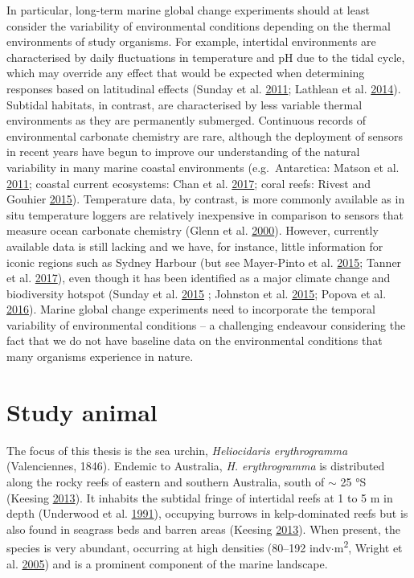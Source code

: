 \documentclass[a4paper,10pt, oneside]{memoir}
\begin{document}
In particular, long-term marine global change experiments should at least consider the variability of environmental conditions depending on the thermal environments of study organisms.
For example, intertidal environments are characterised by daily fluctuations in temperature and pH due to the tidal cycle, which may override any effect that would be expected when determining responses based on latitudinal effects (Sunday et al. \protect\hyperlink{ref-Sunday2011}{2011}; Lathlean et al. \protect\hyperlink{ref-Lathlean2014}{2014}).
Subtidal habitats, in contrast, are characterised by less variable thermal environments as they are permanently submerged.
Continuous records of environmental carbonate chemistry are rare, although the deployment of sensors in recent years have begun to improve our understanding of the natural variability in many marine coastal environments (e.g.~Antarctica: Matson et al. \protect\hyperlink{ref-Matson2011}{2011}; coastal current ecosystems: Chan et al. \protect\hyperlink{ref-Chan2017}{2017}; coral reefs: Rivest and Gouhier \protect\hyperlink{ref-Rivest2015}{2015}).
Temperature data, by contrast, is more commonly available as in situ temperature loggers are relatively inexpensive in comparison to sensors that measure ocean carbonate chemistry (Glenn et al. \protect\hyperlink{ref-Glenn2000}{2000}).
However, currently available data is still lacking and we have, for instance, little information for iconic regions such as Sydney Harbour (but see Mayer-Pinto et al. \protect\hyperlink{ref-Mayer-Pinto2015}{2015}; Tanner et al. \protect\hyperlink{ref-Tanner2017}{2017}), even though it has been identified as a major climate change and biodiversity hotspot (Sunday et al. \protect\hyperlink{ref-Sunday2015}{2015} ; Johnston et al. \protect\hyperlink{ref-Johnston2015}{2015}; Popova et al. \protect\hyperlink{ref-Popova2016}{2016}).
Marine global change experiments need to incorporate the temporal variability of environmental conditions -- a challenging endeavour considering the fact that we do not have baseline data on the environmental conditions that many organisms experience in nature.

\hypertarget{study-animal}{%
\section{Study animal}\label{study-animal}}

The focus of this thesis is the sea urchin, \emph{Heliocidaris erythrogramma} (Valenciennes, 1846).
Endemic to Australia, \emph{H. erythrogramma} is distributed along the rocky reefs of eastern and southern Australia, south of \(\sim\) 25 °S (Keesing \protect\hyperlink{ref-Keesing2013}{2013}). It inhabits the subtidal fringe of intertidal reefs at 1 to 5 m in depth (Underwood et al. \protect\hyperlink{ref-Underwood1991}{1991}), occupying burrows in kelp-dominated reefs but is also found in seagrass beds and barren areas (Keesing \protect\hyperlink{ref-Keesing2013}{2013}).
When present, the species is very abundant, occurring at high densities (80--192 indv\(\cdot\)m\textsuperscript{2}, Wright et al. \protect\hyperlink{ref-Wright2005}{2005}) and is a prominent component of the marine landscape.
\end{document}
